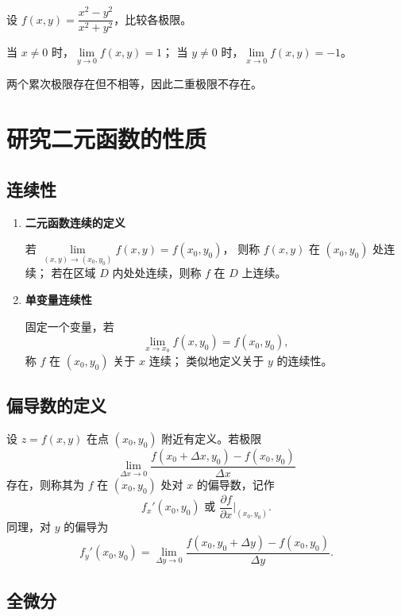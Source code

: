 \begin{example}{}{}
    设 $f(x,y)=\dfrac{x^2-y^2}{x^2+y^2}$，比较各极限。
\end{example}

\begin{solution}
    当 $x\ne0$ 时，$\lim\limits_{y\to0}f(x,y)=1$；
    当 $y\ne0$ 时，$\lim\limits_{x\to0}f(x,y)=-1$。

    两个累次极限存在但不相等，因此二重极限不存在。
\end{solution}


\section{研究二元函数的性质}

\subsection{连续性}

\begin{enumerate}
    \item \textbf{二元函数连续的定义}

          若 $\lim\limits_{(x,y)\to(x_0,y_0)}f(x,y)=f(x_0,y_0)$，
          则称 $f(x,y)$ 在 $(x_0,y_0)$ 处连续；
          若在区域 $D$ 内处处连续，则称 $f$ 在 $D$ 上连续。

    \item \textbf{单变量连续性}

          固定一个变量，若
          $$
              \lim_{x\to x_0} f(x,y_0)=f(x_0,y_0),
          $$
          称 $f$ 在 $(x_0,y_0)$ 关于 $x$ 连续；
          类似地定义关于 $y$ 的连续性。
\end{enumerate}


\subsection{偏导数的定义}

设 $z=f(x,y)$ 在点 $(x_0,y_0)$ 附近有定义。若极限
$$
    \lim_{\Delta x\to0}\frac{f(x_0+\Delta x,y_0)-f(x_0,y_0)}{\Delta x}
$$
存在，则称其为 $f$ 在 $(x_0,y_0)$ 处对 $x$ 的偏导数，记作
$$
    f_x'(x_0,y_0)\text{ 或 }\frac{\partial f}{\partial x}\bigg|_{(x_0,y_0)}.
$$
同理，对 $y$ 的偏导为
$$
    f_y'(x_0,y_0)=\lim_{\Delta y\to0}\frac{f(x_0,y_0+\Delta y)-f(x_0,y_0)}{\Delta y}.
$$


\subsection{全微分}

